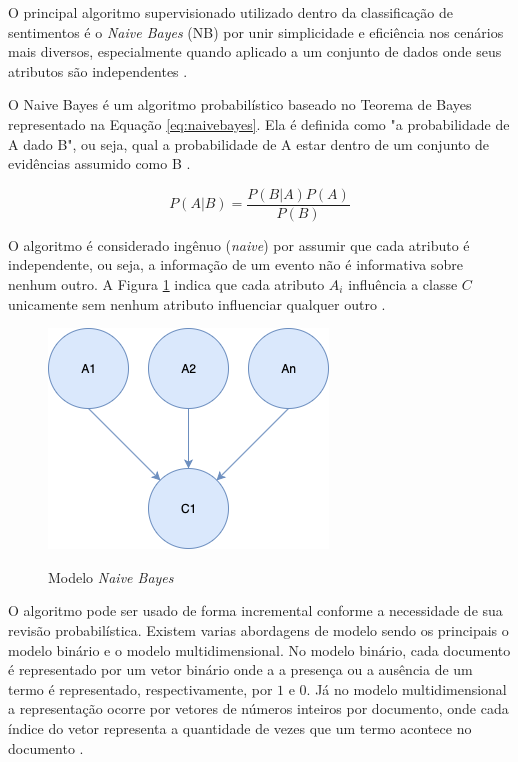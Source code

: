 O principal algoritmo supervisionado utilizado dentro da classificação de sentimentos é o \textit{Naive Bayes} (NB) por unir simplicidade e eficiência nos cenários mais diversos, especialmente quando aplicado a um conjunto de dados onde seus atributos são independentes \cite{VIEGAS2018153}. 

O Naive Bayes é um algoritmo probabilístico baseado no Teorema de Bayes representado na Equação \ref{eq:naivebayes}. Ela é definida como "a probabilidade de A dado B", ou seja, qual a probabilidade de A estar dentro de um conjunto de evidências assumido como B \cite{schmitt2013analise}.

\begin{equation}
    \label{eq:naivebayes}
     P\left ( A| B \right ) = \frac{P\left ( B|A \right )P\left ( A \right )}{P\left ( B \right )}
\end{equation}

O algoritmo é considerado ingênuo (\textit{naive}) por assumir que cada atributo é independente, ou seja, a informação de um evento não é informativa sobre nenhum outro. A Figura \ref{fig:ModeloNaiveBayes}  indica que cada atributo $A_{i}$ influência a classe $C$ unicamente sem nenhum atributo influenciar qualquer outro \cite{schmitt2013analise}.

\begin{figure}[!h]
\centering 
\caption{Modelo \textit{Naive Bayes}}
\includegraphics[scale=0.70]{imagens/modeloNaiveBayes.png}
\label{fig:ModeloNaiveBayes}
\end{figure}

O algoritmo pode ser usado de forma incremental conforme a necessidade de sua revisão probabilística. Existem varias abordagens de modelo sendo os principais o modelo binário e o modelo multidimensional. No modelo binário, cada documento é representado por um vetor binário onde a a presença ou a ausência de um termo é representado, respectivamente, por $1$ e $0$. Já no modelo multidimensional a representação ocorre por vetores de números inteiros por documento, onde  cada índice do vetor representa a quantidade de vezes que um termo acontece no documento \cite{schmitt2013analise}.


